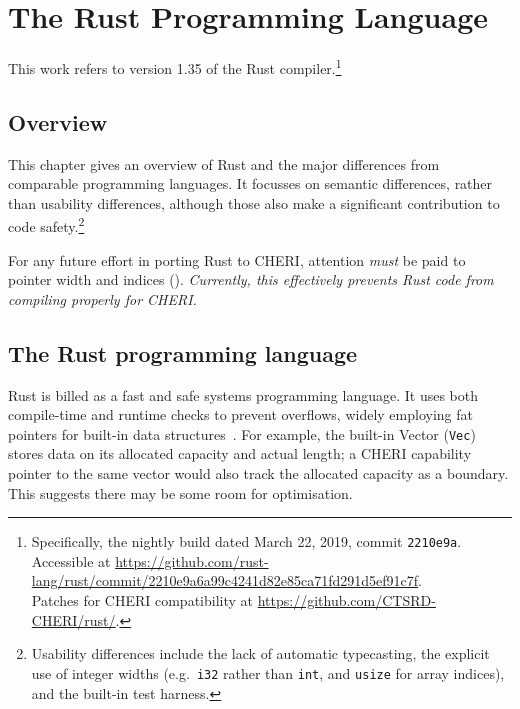 \documentclass[dissertation.tex]{subfiles}
\begin{document}
\chapter{The Rust Programming Language}
\label{ch:rust}

This work refers to version 1.35 of the Rust
compiler.\footnote{Specifically, the nightly build dated March 22, 2019,
commit \texttt{2210e9a}. \\ Accessible at
\url{https://github.com/rust-lang/rust/commit/2210e9a6a99c4241d82e85ca71fd291d5ef91c7f}.
\\ Patches for CHERI compatibility at \url{https://github.com/CTSRD-CHERI/rust/}.}


\section{Overview}
This chapter gives an overview of Rust and the major differences from
comparable programming languages.
It focusses on semantic differences, rather than usability differences,
although those also make a significant contribution to code
safety.\footnote{Usability differences include the lack of automatic
typecasting, the explicit use of integer widths (e.g.~\texttt{i32}
rather than \texttt{int}, and \texttt{usize} for array indices), and the
built-in test harness.}

For any future effort in porting Rust to CHERI, attention \emph{must} be
paid to pointer width and indices ().
\emph{Currently, this effectively prevents Rust code from compiling
properly for CHERI.}



\section{The Rust programming language}
Rust is billed as a fast and safe systems programming language.
It uses both compile-time and runtime checks to prevent overflows,
widely employing fat pointers for built-in data
structures~\cite{blandy-orendorff}.
For example, the built-in Vector (\texttt{Vec}) stores data on its
allocated capacity and actual length; a CHERI capability pointer to the
same vector would also track the allocated capacity as a boundary.
This suggests there may be some room for optimisation.


\end{document}
